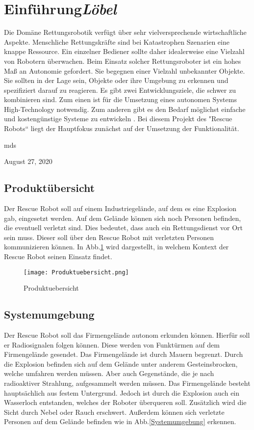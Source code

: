 
\section{Einführung\hfill\textnormal{\emph{Löbel}}}
Die Domäne Rettungsrobotik verfügt über sehr vielversprechende wirtschaftliche Aspekte. Menschliche Rettungskräfte sind bei Katastrophen Szenarien eine knappe Ressource. Ein einzelner Bediener sollte daher idealerweise eine Vielzahl von Robotern überwachen. Beim Einsatz solcher Rettungsroboter ist ein hohes Maß an Autonomie gefordert. Sie begegnen einer Vielzahl unbekannter Objekte. Sie sollten in der Lage sein, Objekte oder ihre Umgebung zu erkennen und spezifiziert darauf zu reagieren. Es gibt zwei Entwicklungsziele, die schwer zu kombinieren sind. Zum einen ist für die Umsetzung eines autonomen Systems High-Technology notwendig. Zum anderen gibt es den Bedarf möglichst einfache und kostengünstige Systeme zu entwickeln \cite{birk2006rescue}. Bei diesem Projekt des "Rescue Robots“ liegt der Hauptfokus zunächst auf der Umsetzung der Funktionalität.

\hfill mds

\hfill August 27, 2020

\subsection{Produktübersicht}
Der Rescue Robot soll auf einem Industriegelände, auf dem es eine Explosion gab, eingesetzt werden. Auf dem Gelände können sich noch Personen befinden, die eventuell verletzt sind. Dies bedeutet, dass auch ein Rettungsdienst vor Ort sein muss. Dieser soll über den Rescue Robot mit verletzten Personen kommunizieren können. In Abb.\ref{Produktuebersicht} wird dargestellt, in welchem Kontext der Rescue Robot seinen Einsatz findet.

\begin{figure}[H]
  \centering\texttt{[image: Produktuebersicht.png]}
  \caption{Produktuebersicht}
  \label{Produktuebersicht}
\end{figure}

\subsection{Systemumgebung}
Der Rescue Robot soll das Firmengelände autonom erkunden können. Hierfür soll er Radiosignalen folgen können. Diese werden von Funktürmen auf dem Firmengelände gesendet. Das Firmengelände ist durch Mauern begrenzt. Durch die Explosion befinden sich auf dem Gelände unter anderem Gesteinsbrocken, welche umfahren werden müssen. Aber auch Gegenstände, die je nach radioaktiver Strahlung, aufgesammelt werden müssen. Das Firmengelände besteht hauptsächlich aus festem Untergrund. Jedoch ist durch die Explosion auch ein Wasserloch entstanden, welches der Roboter überqueren soll. Zusätzlich wird die Sicht durch Nebel oder Rauch erschwert. Außerdem können sich verletzte Personen auf dem Gelände befinden wie in Abb.\ref{Systemumgebung} erkennen. 

